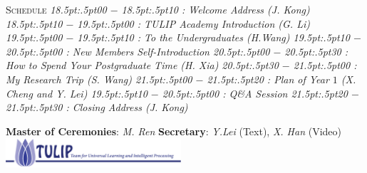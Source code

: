 \documentclass{article}
\begin{document}
\smallbreak
{\scshape  Schedule}
\textit{%
\footnotesize{
  18\kern.5pt:\kern.5pt00 $-$ 18\kern.5pt:\kern.5pt10 : Welcome Address (J. Kong)
  18\kern.5pt:\kern.5pt10 $-$ 19\kern.5pt:\kern.5pt00 : TULIP Academy Introduction (G. Li)
  19\kern.5pt:\kern.5pt00 $-$ 19\kern.5pt:\kern.5pt10 : To the Undergraduates (H.Wang)
  19\kern.5pt:\kern.5pt10 $-$ 20\kern.5pt:\kern.5pt00 : New Members Self-Introduction
  20\kern.5pt:\kern.5pt00 $-$ 20\kern.5pt:\kern.5pt30 : How to Spend Your Postgraduate Time (H. Xia)
  20\kern.5pt:\kern.5pt30 $-$ 21\kern.5pt:\kern.5pt00 : My Research Trip (S. Wang)
  21\kern.5pt:\kern.5pt00 $-$ 21\kern.5pt:\kern.5pt20 : Plan of Year $1$ (X. Cheng and Y. Lei)
  19\kern.5pt:\kern.5pt10 $-$ 20\kern.5pt:\kern.5pt00 : Q\&A Session
  21\kern.5pt:\kern.5pt20 $-$ 21\kern.5pt:\kern.5pt30 : Closing Address (J. Kong)}
}

\smallbreak
\smallbreak
{\scshape }
%
\tiny{  
\textbf{Master of Ceremonies}: \textit{M. Ren}
\textbf{Secretary}: \textit{Y.Lei} (Text), \textit{X. Han} (Video)
}
\smallbreak
\includegraphics[width=6.5cm]{logos/tulip-wordmark.eps}
\end{document}
